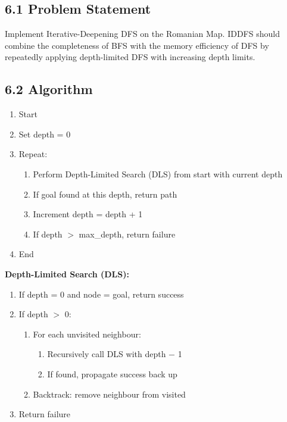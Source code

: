 \documentclass[12pt,a4paper]{article}
\begin{document}
\subsection*{6.1 Problem Statement}

Implement Iterative-Deepening DFS on the Romanian Map. IDDFS should combine the completeness of BFS with the memory efficiency of DFS by repeatedly applying depth-limited DFS with increasing depth limits.

\subsection*{6.2 Algorithm}

\begin{enumerate}[leftmargin=1.6em]
  \item Start
  \item Set depth = 0
  \item Repeat:
  \begin{enumerate}[leftmargin=1.6em,label=(\alph*)]
    \item Perform Depth-Limited Search (DLS) from start with current depth
    \item If goal found at this depth, return path
    \item Increment depth = depth + 1
    \item If depth $>$ max\_depth, return failure
  \end{enumerate}
  \item End
\end{enumerate}

\textbf{Depth-Limited Search (DLS):}
\begin{enumerate}[leftmargin=1.6em,label=(\alph*)]
  \item If depth = 0 and node = goal, return success
  \item If depth $>$ 0:
  \begin{enumerate}[leftmargin=1.6em,label=\roman*.]
    \item For each unvisited neighbour:
    \begin{enumerate}[leftmargin=1.6em,label=\Alph*.]
      \item Recursively call DLS with depth $-$ 1
      \item If found, propagate success back up
    \end{enumerate}
    \item Backtrack: remove neighbour from visited
  \end{enumerate}
  \item Return failure
\end{enumerate}
\end{document}
